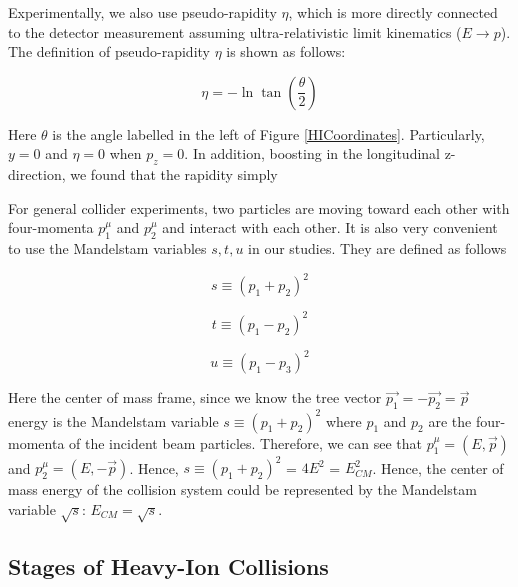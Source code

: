 Experimentally, we also use pseudo-rapidity $\eta$, which is more directly connected to the detector measurement assuming ultra-relativistic limit kinematics ($E \rightarrow p$). The definition of pseudo-rapidity $\eta$ is shown as follows:

\begin{equation}
\eta =  - \ln \tan(\frac{\theta}{2})
\end{equation}

Here $\theta$ is the angle labelled in the left of Figure \ref{HICoordinates}. Particularly, $y = 0$ and $\eta = 0$ when $p_z = 0$. In addition, boosting in the longitudinal z-direction, we found that the rapidity simply 

For general collider experiments, two particles are moving toward each other with four-momenta $p_1^\mu$ and $p_2^\mu$ and interact with each other. It is also very convenient to use the Mandelstam variables $s, t, u$ in our studies. They are defined as follows

\begin{equation}
s \equiv (p_1 + p_2)^2
\end{equation}

\begin{equation}
t \equiv (p_1 - p_2)^2
\end{equation}

\begin{equation}
u \equiv (p_1 - p_3)^2
\end{equation}


Here the center of mass frame, since we know the tree vector $\vec{p_1} = -\vec{p_2} = \vec{p}$ energy is the Mandelstam variable $s \equiv (p_1 + p_2)^2$ where $p_1$ and $p_2$ are the four-momenta of the incident beam particles. Therefore, we can see that $p_1^\mu = (E, \vec{p})$ and $p_2^\mu = (E, -\vec{p})$. Hence, $s \equiv (p_1 + p_2)^2$ = $4E^2$ = $E_{CM}^2$. Hence, the center of mass energy of the collision system could be represented by the Mandelstam variable $\sqrt{s}$: $E_{CM} = \sqrt{s}$.



\subsection{Stages of Heavy-Ion Collisions}

